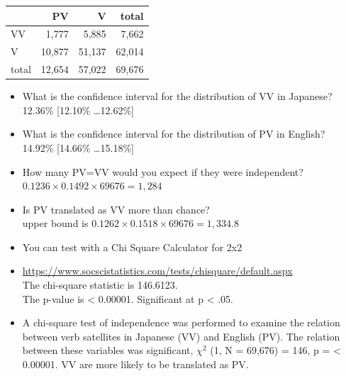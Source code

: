 \documentclass[a4paper,landscape,headrule,footrule,xetex]{foils}
\begin{document}
\begin{center}
  \begin{tabular}{l|rrr}
      & PV & V  &  total \\ \hline
   VV &   1,777 &  5,885  & 7,662  \\ %
    V &  10,877 & 51,137  &  62,014      \\ %
    total &  12,654 & 57,022 &  69,676\\
            
  \end{tabular}
\end{center}
  \begin{itemize}\addtolength{\itemsep}{-2ex}
  \item What is the confidence interval for the distribution of VV in Japanese?
    \\ 12.36\% [12.10\% \ldots 12.62\%]
  \item What is the confidence interval for the distribution of PV in English?
    \\ 14.92\% 	[14.66\% \ldots 15.18\%]
  \item How many PV=VV would you expect if they were independent?
    \\ $0.1236 \times 0.1492 \times 69676 = 1,284$
  \item Is PV translated as VV more than chance?
    \\ upper bound is $0.1262 \times 0.1518 \times 69676 = 1,334.8$
  \end{itemize}



\begin{itemize}
\item You can test with a Chi Square Calculator for 2x2
\item \url{https://www.socscistatistics.com/tests/chisquare/default.aspx}
  \\ The chi-square statistic is 146.6123.
  \\ The p-value is < 0.00001. Significant at p < .05.
\item A chi-square test of independence was performed to examine the relation between  verb satellites in Japanese (VV) and English (PV).  The relation between these variables was significant, $\chi^2$ (1, N = 69,676) = 146,  p = < 0.00001. VV are more likely to be translated as PV.
\end{itemize}
\end{document}
